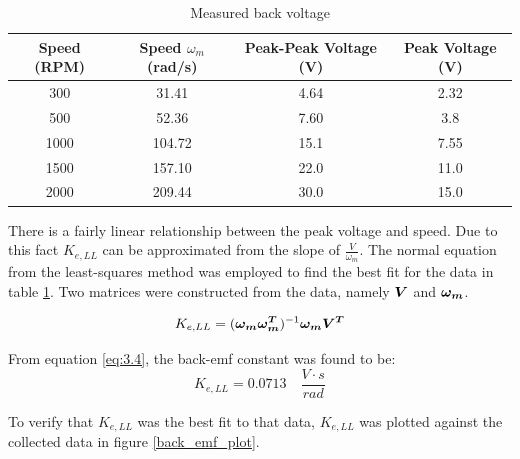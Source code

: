 \begin{table}[ht]
\begin{center}
\caption{Measured back voltage }
\begin{tabular}[c]{|c|c|c|c|}

\hline
\textbf{Speed (RPM)} & \textbf{Speed \(\omega_m\) (rad/s)} & \textbf{Peak-Peak Voltage (V)} & \textbf{Peak Voltage (V)}\\

\hline
300  & 31.41  & 4.64 & 2.32\\

\hline
500 & 52.36 & 7.60 & 3.8\\

\hline
1000 & 104.72 & 15.1 & 7.55\\

\hline
1500 & 157.10 & 22.0 & 11.0\\

\hline
2000 & 209.44 & 30.0 & 15.0\\

\hline
\end{tabular}

\label{table3}
\end{center}
\end{table}

There is a fairly linear relationship between the peak voltage and speed. Due to this fact \(K_{e,LL}\) can be approximated from the slope of \(\frac{V}{\omega_m}\). The normal equation from the least-squares method was employed to find the best fit for the data in table \ref{table3}. Two matrices were constructed from the data, namely \(\bm{V}\) and \(\bm{\omega_m}\).

\begin{equation} \label{eq:3.4}
K_{e,LL} = (\bm{\omega_m \omega_m^T})^{-1} \bm{\omega_m V^T}
\end{equation} 

From equation \ref{eq:3.4}, the back-emf constant was found to be: 
\[K_{e,LL} = 0.0713 \quad \frac{V \cdot s}{rad} \]

To verify that \(K_{e,LL}\) was the best fit to that data, \(K_{e,LL}\) was plotted against the collected data in figure \ref{back_emf_plot}.

